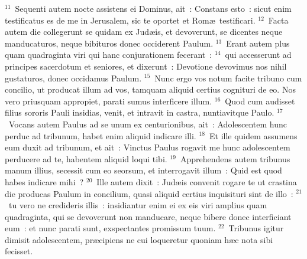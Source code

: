 ${}^{11}$~Sequenti autem nocte assistens ei Dominus, ait~: Constans esto~: sicut enim testificatus es de me in Jerusalem, sic te oportet et Rom\ae\ testificari.
${}^{12}$~Facta autem die collegerunt se quidam ex Jud\ae is, et devoverunt, se dicentes neque manducaturos, neque bibituros donec occiderent Paulum.
${}^{13}$~Erant autem plus quam quadraginta viri qui hanc conjurationem fecerant~:
${}^{14}$~qui accesserunt ad principes sacerdotum et seniores, et dixerunt~: Devotione devovimus nos nihil gustaturos, donec occidamus Paulum.
${}^{15}$~Nunc ergo vos notum facite tribuno cum concilio, ut producat illum ad vos, tamquam aliquid certius cognituri de eo. Nos vero priusquam appropiet, parati sumus interficere illum.
${}^{16}$~Quod cum audisset filius sororis Pauli insidias, venit, et intravit in castra, nuntiavitque Paulo.
${}^{17}$~Vocans autem Paulus ad se unum ex centurionibus, ait~: Adolescentem hunc perduc ad tribunum, habet enim aliquid indicare illi.
${}^{18}$~Et ille quidem assumens eum duxit ad tribunum, et ait~: Vinctus Paulus rogavit me hunc adolescentem perducere ad te, habentem aliquid loqui tibi.
${}^{19}$~Apprehendens autem tribunus manum illius, secessit cum eo seorsum, et interrogavit illum~: Quid est quod habes indicare mihi~?
${}^{20}$~Ille autem dixit~: Jud\ae is convenit rogare te ut crastina die producas Paulum in concilium, quasi aliquid certius inquisituri sint de illo~:
${}^{21}$~tu vero ne credideris illis~: insidiantur enim ei ex eis viri amplius quam quadraginta, qui se devoverunt non manducare, neque bibere donec interficiant eum~: et nunc parati sunt, exspectantes promissum tuum.
${}^{22}$~Tribunus igitur dimisit adolescentem, pr\ae cipiens ne cui loqueretur quoniam h\ae c nota sibi fecisset.


